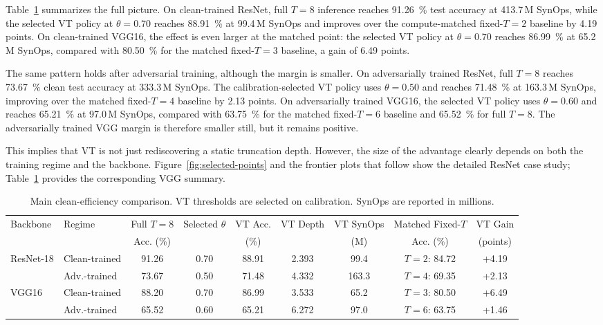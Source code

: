 \documentclass[11pt]{article}
\begin{document}
Table~\ref{tab:main_results} summarizes the full picture. On clean-trained ResNet, full $T=8$ inference reaches \SI{91.26}{\percent} test accuracy at \num{413.7}\,M SynOps, while the selected VT policy at $\theta=0.70$ reaches \SI{88.91}{\percent} at \num{99.4}\,M SynOps and improves over the compute-matched fixed-$T=2$ baseline by 4.19 points. On clean-trained VGG16, the effect is even larger at the matched point: the selected VT policy at $\theta=0.70$ reaches \SI{86.99}{\percent} at \num{65.2}\,M SynOps, compared with \SI{80.50}{\percent} for the matched fixed-$T=3$ baseline, a gain of 6.49 points.

The same pattern holds after adversarial training, although the margin is smaller. On adversarially trained ResNet, full $T=8$ reaches \SI{73.67}{\percent} clean test accuracy at \num{333.3}\,M SynOps. The calibration-selected VT policy uses $\theta=0.50$ and reaches \SI{71.48}{\percent} at \num{163.3}\,M SynOps, improving over the matched fixed-$T=4$ baseline by 2.13 points. On adversarially trained VGG16, the selected VT policy uses $\theta=0.60$ and reaches \SI{65.21}{\percent} at \num{97.0}\,M SynOps, compared with \SI{63.75}{\percent} for the matched fixed-$T=6$ baseline and \SI{65.52}{\percent} for full $T=8$. The adversarially trained VGG margin is therefore smaller still, but it remains positive.

This implies that VT is not just rediscovering a static truncation depth. However, the size of the advantage clearly depends on both the training regime and the backbone. Figure~\ref{fig:selected-points} and the frontier plots that follow show the detailed ResNet case study; Table~\ref{tab:main_results} provides the corresponding VGG summary.

\begin{table}[t]
\centering
\caption{Main clean-efficiency comparison. VT thresholds are selected on calibration. SynOps are reported in millions.}
\label{tab:main_results}
\begin{tabular}{llccccccc}
\toprule
Backbone & Regime & Full $T=8$ & Selected $\theta$ & VT Acc. & VT Depth & VT SynOps & Matched Fixed-$T$ & VT Gain \\
 &  & Acc. (\%) &  & (\%) &  & (M) & Acc. (\%) & (points) \\
\midrule
\multirow{2}{*}{ResNet-18} & Clean-trained & 91.26 & 0.70 & 88.91 & 2.393 & 99.4 & $T=2$: 84.72 & +4.19 \\
 & Adv.-trained & 73.67 & 0.50 & 71.48 & 4.332 & 163.3 & $T=4$: 69.35 & +2.13 \\
\multirow{2}{*}{VGG16} & Clean-trained & 88.20 & 0.70 & 86.99 & 3.533 & 65.2 & $T=3$: 80.50 & +6.49 \\
 & Adv.-trained & 65.52 & 0.60 & 65.21 & 6.272 & 97.0 & $T=6$: 63.75 & +1.46 \\
\bottomrule
\end{tabular}
\end{table}
\end{document}
